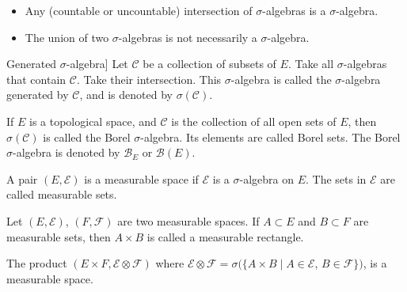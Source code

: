 \documentclass[english, course]{Notes}
\begin{document}
\begin{theorem}
\begin{itemize}
	\item Any (countable or uncountable) intersection of $\sigma$-algebras is a $\sigma$-algebra.
	\item The union of two $\sigma$-algebras is not necessarily a $\sigma$-algebra.\\
\end{itemize}
\end{theorem}

\begin{definition}[]Generated $\sigma$-algebra]
	Let $\mathcal{C}$ be a collection of subsets of $E$. Take all $\sigma$-algebras that contain $\mathcal{C}$. Take their intersection. This $\sigma$-algebra is called the $\sigma$-algebra generated by $\mathcal{C}$, and is denoted by $\sigma(\mathcal{C})$.
\end{definition}

\begin{definition}
	If $E$ is a topological space, and $\mathcal{C}$ is the collection of all open sets of $E$, then $\sigma (\mathcal{C})$ is called the Borel $\sigma$-algebra. Its elements are called Borel sets. The Borel $\sigma$-algebra is denoted by $\mathcal{B}_E$ or $\mathcal{B}(E)$.
\end{definition}

\begin{definition}
	A pair $(E, \mathcal{E})$ is a measurable space if $\mathcal{E}$ is a $\sigma$-algebra on $E$. The sets in $\mathcal{E}$ are called measurable sets.
\end{definition}

\begin{definition}
	Let $(E, \mathcal{E})$, $(F, \mathcal{F})$ are two measurable spaces. If $A \subset E$ and $B \subset F$ are measurable sets, then $A \times B$ is called a measurable rectangle.\\
\end{definition}

\begin{definition}
	The product $(E \times F, \mathcal{E} \otimes \mathcal{F})$ where $\mathcal{E} \otimes \mathcal{F} = \sigma(\{A \times B \mid A \in \mathcal{E}$, $B \in \mathcal{F}\})$, is a measurable space.\\
\end{definition}
\end{document}
